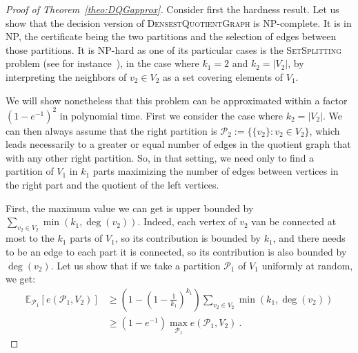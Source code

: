 \begin{proof}[Proof of Theorem~\ref{theo:DQGapprox}]
  Consider first the hardness result. Let us show that the decision version of \textsc{DensestQuotientGraph} is \textrm{NP}-complete. It is in \textrm{NP}, the certificate being the two partitions and the selection of edges between those partitions. It is \textrm{NP}-hard as one of its particular cases is the \textsc{SetSplitting} problem (see for instance~\cite{GJ79}), in the case where $k_1=2$ and $k_2=|V_2|$, by interpreting the neighbors of $v_2 \in V_2$ as a set covering elements of $V_1$.

We will show nonetheless that this problem can be approximated within a factor $(1-e^{-1})^2$ in polynomial time. First we consider the case where $k_2=|V_2|$. We can then always assume that the right partition is $\mathcal{P}_2 := \{ \{v_2\} : v_2 \in V_2 \}$, which leads necessarily to a greater or equal number of edges in the quotient graph that with any other right partition. So, in that setting, we need only to find a partition of $V_1$ in $k_1$ parts maximizing the number of edges between vertices in the right part and the quotient of the left vertices.

First, the maximum value we can get is upper bounded by $\sum_{v_2 \in V_2}\min\left(k_1,\deg(v_2)\right)$. Indeed, each vertex of $v_2$ van be connected at most to the $k_1$ parts of $V_1$, so its contribution is bounded by $k_1$, and there needs to be an edge to each part it is connected, so its contribution is also bounded by $\deg(v_2)$. Let us show that if we take a partition $\mathcal{P}_1$ of $V_1$ uniformly at random, we get:
\begin{equation}
  \begin{aligned}
  \mathbb{E}_{\mathcal{P}_1}[e(\mathcal{P}_1,V_2)] &\geq \left(1-\left(1-\frac{1}{k_1}\right)^{k_1}\right)\sum_{v_2 \in V_2}\min\left(k_1,\deg(v_2)\right)\\
  &\geq (1-e^{-1})\max_{\mathcal{P}_1}e(\mathcal{P}_1,V_2) \ .
  \end{aligned}
\end{equation}  


\end{proof}
